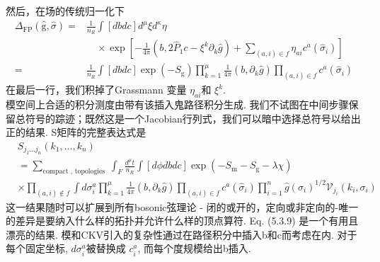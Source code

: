 然后，在场的传统归一化下
\begin{equation}
	\begin{aligned}
		\Delta_{\mathrm{FP}}(\hat{\mathrm{g}}, \hat{\sigma})=& \frac{1}{n_{R}} \int[d b d c] d^{\mu} \xi d^{\kappa} \eta \\
		&\quad \times \exp \left[-\frac{1}{4 \pi}\left(b, 2 \hat{P}_{1} c-\xi^{k} \partial_{k} \hat{g}\right)+\sum_{(a, i) \in f} \eta_{a i} c^{a}\left(\hat{\sigma}_{i}\right)\right] \\
		=& \frac{1}{n_{R}} \int[d b d c] \exp \left(-S_{\mathrm{g}}\right) \prod_{k=1}^{\mu} \frac{1}{4 \pi}\left(b, \partial_{k} \hat{g}\right) \prod_{(a, i) \in f} c^{a}\left(\hat{\sigma}_{i}\right)
	\end{aligned}
\end{equation}
在最后一行，我们积掉了Grassmann 变量 $\eta_{a i}$和 $\xi^{k}$.\\
模空间上合适的积分测度由带有该插入鬼路径积分生成. 我们不试图在中间步骤保留总符号的踪迹；既然这是一个Jacobian行列式，我们可以暗中选择总符号以给出正的结果. S矩阵的完整表达式是
\begin{equation}
	\begin{aligned}
		&S_{j_{1} \ldots j_{n}}\left(k_{1}, \ldots, k_{n}\right)\\
		&=\sum_{\text {compact },\text { topologies }} \int_{F} \frac{d^{\mu} t}{n_{R}} \int[d \phi d b d c] \exp \left(-S_{\mathrm{m}}-S_{\mathrm{g}}-\lambda \chi\right) \\
		&\times \prod_{(a, i) \notin f} \int d \sigma_{i}^{a} \prod_{k=1}^{\mu} \frac{1}{4 \pi}\left(b, \partial_{k} \hat{g}\right) \prod_{(a, i) \in f} c^{a}\left(\hat{\sigma}_{i}\right) \prod_{i=1}^{n} \hat{g}\left(\sigma_{i}\right)^{1 / 2} \mathscr{V}_{j_{i}}\left(k_{i}, \sigma_{i}\right)
	\end{aligned}
\end{equation}
这一结果随时可以扩展到所有bosonic弦理论 - 闭的或开的，定向或非定向的-唯一的差异是要纳入什么样的拓扑并允许什么样的顶点算符. Eq. (5.3.9) 是一个有用且漂亮的结果. 模和CKV引入的复杂性通过在路径积分中插入b和c而考虑在内. 对于每个固定坐标, $d \sigma_{i}^{a}$被替换成 $c_{i}^{a}$, 而每个度规模给出b插入.

